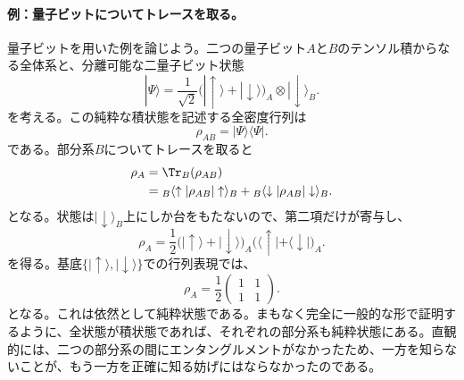 \documentclass[a4paper,11pt,oneside]{article}
\theoremstyle{definition}
\numberwithin{equation}{section}
\begin{document}
\paragraph{例：量子ビットについてトレースを取る。} 量子ビットを用いた例を論じよう。二つの量子ビット$ A$と$ B$のテンソル積からなる全体系と、分離可能な二量子ビット状態
\begin{equation}
|\Psi\rangle
=
\frac{1}{\sqrt{2}}\bigl(|\uparrow\rangle + |\downarrow\rangle\bigr)_A
\otimes
|\downarrow\rangle_B .
\end{equation}
を考える。この純粋な積状態を記述する全密度行列は
\begin{equation}
\rho_{AB}=|\Psi\rangle\langle\Psi| .
\end{equation}
である。部分系$B$についてトレースを取ると
\begin{align}
\rho_A
&=
\Tr_B(\rho_{AB})
\nonumber\\
&=
{}_B\langle\uparrow|\rho_{AB}|\uparrow\rangle_B
+
{}_B\langle\downarrow|\rho_{AB}|\downarrow\rangle_B .
\end{align}
となる。状態は$|\downarrow\rangle_B$上にしか台をもたないので、第二項だけが寄与し、
\begin{equation}
\rho_A
=
\frac{1}{2}
\bigl(|\uparrow\rangle+|\downarrow\rangle\bigr)_A
\bigl(\langle\uparrow|+\langle\downarrow|\bigr)_A .
\end{equation}
を得る。基底$\{|\uparrow\rangle,|\downarrow\rangle\}$での行列表現では、
\begin{equation}
\rho_A
=
\frac12
\begin{pmatrix}
1 & 1 \\
1 & 1
\end{pmatrix} .
\end{equation}
となる。これは依然として純粋状態である。まもなく完全に一般的な形で証明するように、全状態が積状態であれば、それぞれの部分系も純粋状態にある。直観的には、二つの部分系の間にエンタングルメントがなかったため、一方を知らないことが、もう一方を正確に知る妨げにはならなかったのである。
\end{document}
